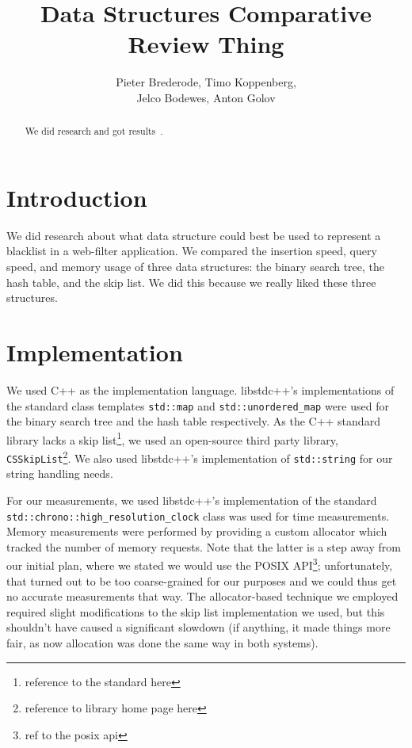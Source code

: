 \documentclass[12pt,a4paper]{article}
\title{Data Structures Comparative Review Thing}
\author{Pieter Brederode, Timo Koppenberg, \\ Jelco Bodewes, Anton Golov}
\begin{document}
    \maketitle

    \begin{abstract}
        We did research and got results~\cite{CallOfCthulhu}.
    \end{abstract}


    \section{Introduction}

    We did research about what data structure could best be used to represent a blacklist in a 
    web-filter application.  We compared the insertion speed, query speed, and memory usage of three
    data structures: the binary search tree, the hash table, and the skip list.  We did this because
    we really liked these three structures. 

    \section{Implementation}

    We used C++ as the implementation language.  libstdc++'s implementations of the standard class
    templates \texttt{std::map} and \texttt{std::unordered\_map} were used for the binary search
    tree and the hash table respectively.  As the C++ standard library lacks a skip
    list\footnote{reference to the standard here}, we used an open-source third party library,
    \texttt{CSSkipList}\footnote{reference to library home page here}.  We also used libstdc++'s
    implementation of \texttt{std::string} for our string handling needs.

    For our measurements, we used libstdc++'s implementation of the standard
    \texttt{std::chrono::high\_resolution\_clock} class was used for time measurements.   Memory
    measurements were performed by providing a custom allocator which tracked the number of memory
    requests.  Note that the latter is a step away from our initial plan, where we stated we would
    use the POSIX API\footnote{ref to the posix api}; unfortunately, that turned out to be too
    coarse-grained for our purposes and we could thus get no accurate measurements that way.  The
    allocator-based technique we employed required slight modifications to the skip list
    implementation we used, but this shouldn't have caused a significant slowdown (if anything, it
    made things more fair, as now allocation was done the same way in both systems).
\end{document}
